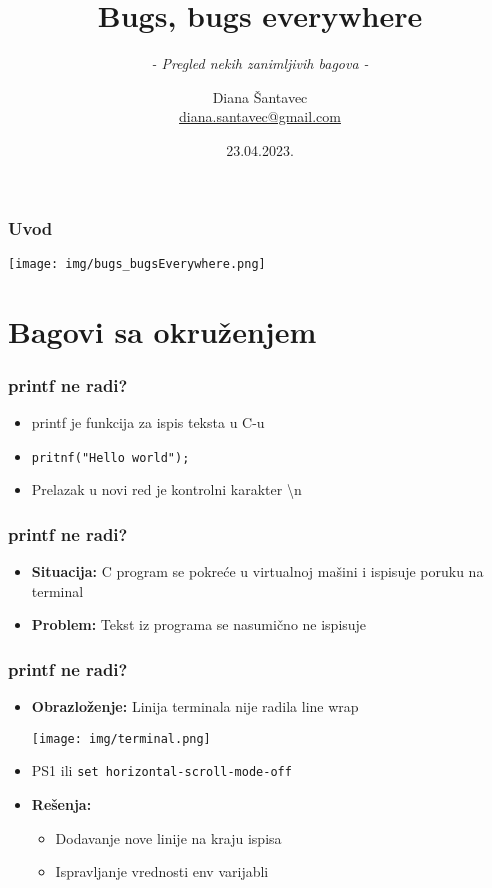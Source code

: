 \documentclass{beamer}
\title{Bugs, bugs everywhere}
\subtitle[]{\textit{ - Pregled nekih zanimljivih bagova -}}
\author[Diana Šantavec]{Diana Šantavec \\ \small \url{diana.santavec@gmail.com}}
\institute{Istraživačka stanica Petnica}
\date{23.04.2023.}
\begin{document}
\frame{\titlepage}


\begin{frame}
\frametitle{Uvod}
\begin{center}
    \texttt{[image: img/bugs\_bugsEverywhere.png]}
\end{center}
\end{frame}

\section{Bagovi sa okruženjem}

\begin{frame}
\frametitle{printf ne radi?}
\begin{itemize}
    \item printf je funkcija za ispis teksta u C-u \newline
    \item \lstinline|pritnf("Hello world");| \newline
    \item Prelazak u novi red je kontrolni karakter \textbackslash n
\end{itemize}
\end{frame}

\begin{frame}
\frametitle{printf ne radi?}
\begin{itemize}
    \item \textbf{Situacija:} C program se pokreće u virtualnoj mašini i ispisuje poruku na terminal \newline
    \item \textbf{Problem:} Tekst iz programa se nasumično ne ispisuje
\end{itemize}
\end{frame}

\begin{frame}
\frametitle{printf ne radi?}
\begin{itemize}
    \item \textbf{Obrazloženje:} Linija terminala nije radila line wrap \newline
    \begin{center}
        \texttt{[image: img/terminal.png]}
    \end{center}
    \item PS1 ili \lstinline|set horizontal-scroll-mode-off| \newline
    \item \textbf{Rešenja: }
    \begin{itemize}
        \item Dodavanje nove linije na kraju ispisa \newline
        \item Ispravljanje vrednosti env varijabli \newline
    \end{itemize}  
    
\end{itemize}
\end{frame}
\end{document}
